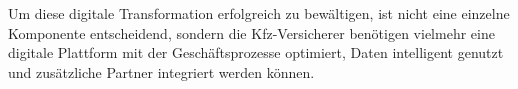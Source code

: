 
Um diese digitale Transformation erfolgreich zu bewältigen, ist nicht eine einzelne Komponente entscheidend, sondern die Kfz-Versicherer benötigen vielmehr eine digitale Plattform mit der Geschäftsprozesse optimiert, Daten intelligent genutzt und zusätzliche Partner integriert werden können. \autocite[Vgl.][]{WEINGARTNER2023}




